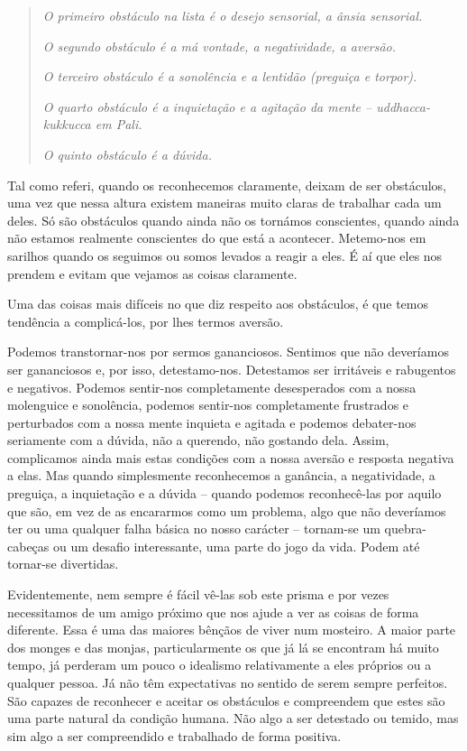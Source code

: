 \begin{quote}
  \itshape
  O primeiro obstáculo na lista é o desejo sensorial, a ânsia sensorial.

  \itshape
  O segundo obstáculo é a má vontade, a negatividade, a aversão.

  \itshape
  O terceiro obstáculo é a sonolência e a lentidão (preguiça e torpor).

  \itshape
  O quarto obstáculo é a inquietação e a agitação da mente -- uddhacca-kukkucca em Pali.

  \itshape
  O quinto obstáculo é a dúvida.
\end{quote}

Tal como referi, quando os reconhecemos claramente, deixam de ser
obstáculos, uma vez que nessa altura existem maneiras muito claras de
trabalhar cada um deles. Só são obstáculos quando ainda não os tornámos
conscientes, quando ainda não estamos realmente conscientes do que está
a acontecer. Metemo-nos em sarilhos quando os seguimos ou somos levados
a reagir a eles. É aí que eles nos prendem e evitam que vejamos as
coisas claramente.

Uma das coisas mais difíceis no que diz respeito aos obstáculos, é que
temos tendência a complicá-los, por lhes termos aversão.

Podemos transtornar-nos por sermos gananciosos. Sentimos que não
deveríamos ser gananciosos e, por isso, detestamo-nos. Detestamos ser
irritáveis e rabugentos e negativos. Podemos sentir-nos completamente
desesperados com a nossa molenguice e sonolência, podemos sentir-nos
completamente frustrados e perturbados com a nossa mente inquieta e
agitada e podemos debater-nos seriamente com a dúvida, não a querendo,
não gostando dela. Assim, complicamos ainda mais estas condições com a
nossa aversão e resposta negativa a elas. Mas quando simplesmente
reconhecemos a ganância, a negatividade, a preguiça, a inquietação e a
dúvida -- quando podemos reconhecê-las por aquilo que são, em vez de as
encararmos como um problema, algo que não deveríamos ter ou uma qualquer
falha básica no nosso carácter -- tornam-se um quebra-cabeças ou um
desafio interessante, uma parte do jogo da vida. Podem até tornar-se
divertidas.

Evidentemente, nem sempre é fácil vê-las sob este prisma e por vezes
necessitamos de um amigo próximo que nos ajude a ver as coisas de forma
diferente. Essa é uma das maiores bênçãos de viver num mosteiro. A maior
parte dos monges e das monjas, particularmente os que já lá se encontram
há muito tempo, já perderam um pouco o idealismo relativamente a eles
próprios ou a qualquer pessoa. Já não têm expectativas no sentido de
serem sempre perfeitos. São capazes de reconhecer e aceitar os
obstáculos e compreendem que estes são uma parte natural da condição
humana. Não algo a ser detestado ou temido, mas sim algo a ser
compreendido e trabalhado de forma positiva.

